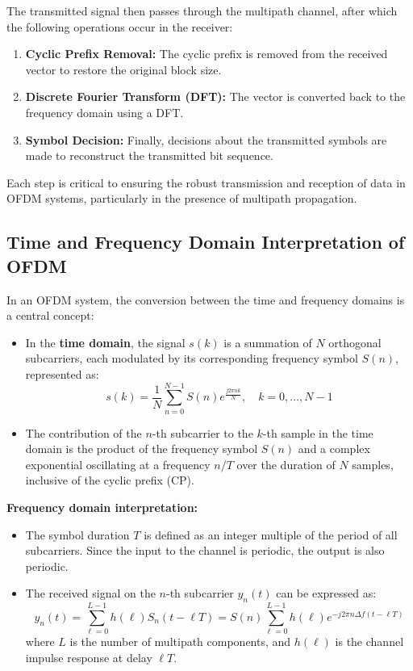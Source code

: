 The transmitted signal then passes through the multipath channel, after which the following operations occur in the receiver:

\begin{enumerate}
    \item \textbf{Cyclic Prefix Removal:} The cyclic prefix is removed from the received vector to restore the original block size.
    \item \textbf{Discrete Fourier Transform (DFT):} The vector is converted back to the frequency domain using a DFT.
    \item \textbf{Symbol Decision:} Finally, decisions about the transmitted symbols are made to reconstruct the transmitted bit sequence.
\end{enumerate}

Each step is critical to ensuring the robust transmission and reception of data in OFDM systems, particularly in the presence of multipath propagation.




\subsection*{Time and Frequency Domain Interpretation of OFDM}

In an OFDM system, the conversion between the time and frequency domains is a central concept:

\begin{itemize}
    \item In the \textbf{time domain}, the signal \(s(k)\) is a summation of \(N\) orthogonal subcarriers, each modulated by its corresponding frequency symbol \(S(n)\), represented as:
    \begin{equation}
        s(k) = \frac{1}{N} \sum_{n=0}^{N-1} S(n) e^{\frac{j2\pi nk}{N}}, \quad k = 0, \ldots, N - 1
    \end{equation}
    \item The contribution of the \(n\)-th subcarrier to the \(k\)-th sample in the time domain is the product of the frequency symbol \(S(n)\) and a complex exponential oscillating at a frequency \(n/T\) over the duration of \(N\) samples, inclusive of the cyclic prefix (CP).
\end{itemize}

\textbf{Frequency domain interpretation:}
\begin{itemize}
    \item The symbol duration \(T\) is defined as an integer multiple of the period of all subcarriers. Since the input to the channel is periodic, the output is also periodic.
    \item The received signal on the \(n\)-th subcarrier \(y_n(t)\) can be expressed as:
    \begin{equation}
        y_n(t) = \sum_{\ell=0}^{L-1} h(\ell)S_n(t - \ell T) = S(n) \sum_{\ell=0}^{L-1} h(\ell)e^{-j2\pi n \Delta f (t - \ell T)}
    \end{equation}
    where \(L\) is the number of multipath components, and \(h(\ell)\) is the channel impulse response at delay \(\ell T\).
\end{itemize}

